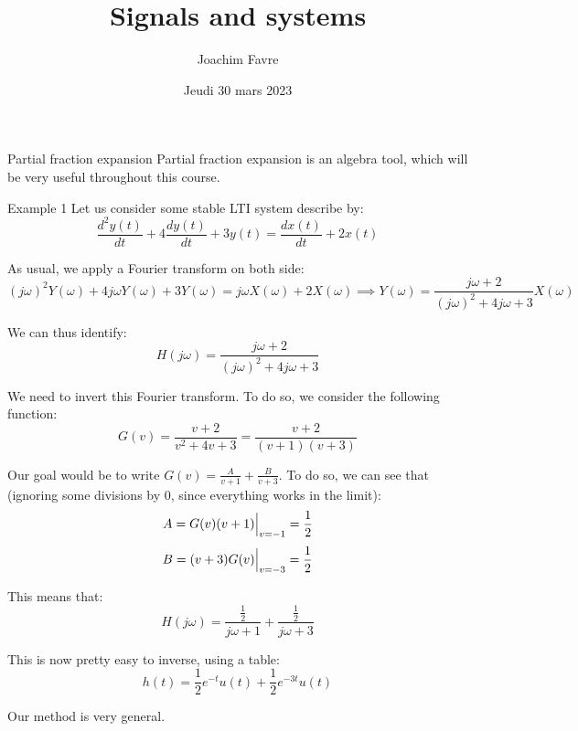 \documentclass[a4paper]{article}
\title{Signals and systems}
\author{Joachim Favre}
\date{Jeudi 30 mars 2023}
\begin{document}
\maketitle


\begin{parag}{Partial fraction expansion}
    Partial fraction expansion is an algebra tool, which will be very useful throughout this course.
\end{parag}

\begin{parag}{Example 1}
    Let us consider some stable LTI system describe by: 
    \[\frac{d^2 y\left(t\right)}{dt} + 4 \frac{dy\left(t\right)}{dt} + 3y\left(t\right) = \frac{dx\left(t\right)}{dt} + 2x\left(t\right)\]
    
    As usual, we apply a Fourier transform on both side: 
    \[\left(j \omega\right)^2 Y\left(\omega\right) + 4 j \omega Y\left(\omega\right) + 3 Y\left(\omega\right) = j \omega X\left(\omega\right) + 2 X\left(\omega\right) \implies Y\left(\omega\right) = \frac{j\omega + 2}{\left(j \omega \right)^2 + 4 j \omega + 3} X\left(\omega\right)\]
    
    We can thus identify: 
    \[H\left(j \omega\right) = \frac{j\omega + 2}{\left(j \omega \right)^2 + 4 j \omega + 3}\]
    
    We need to invert this Fourier transform. To do so, we consider the following function:
    \[G\left(v\right) = \frac{v + 2}{v^2 + 4v + 3} = \frac{v + 2}{\left(v+1\right)\left(v + 3\right)}\]

    Our goal would be to write $G\left(v\right) = \frac{A}{v + 1} + \frac{B}{v + 3}$. To do so, we can see that (ignoring some divisions by 0, since everything works in the limit): 
    \[A = G\left(v\right)\left(v + 1\right) \eval_{v=-1}^{} = \frac{1}{2}\]
    \[B = \left(v + 3\right)G\left(v\right)  \eval_{v=-3}^{} = \frac{1}{2}\]

    This means that: 
    \[H\left(j \omega \right) = \frac{\frac{1}{2}}{j \omega + 1} + \frac{\frac{1}{2}}{j \omega + 3}\]

    This is now pretty easy to inverse, using a table: 
    \[h\left(t\right) = \frac{1}{2} e^{-t} u\left(t\right) + \frac{1}{2} e^{-3t} u\left(t\right)\]

    Our method is very general.
\end{parag}
\end{document}
